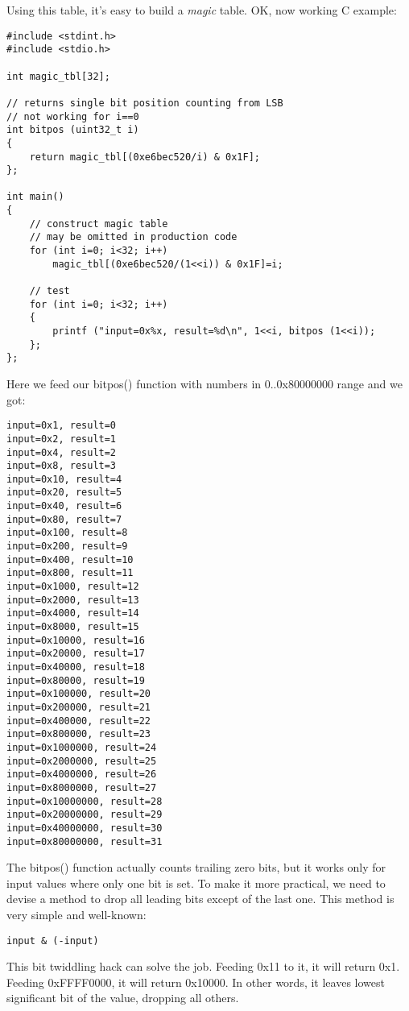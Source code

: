 Using this table, it's easy to build a \textit{magic} table.
OK, now working C example:

\begin{lstlisting}[style=customc]
#include <stdint.h>
#include <stdio.h>

int magic_tbl[32];

// returns single bit position counting from LSB
// not working for i==0
int bitpos (uint32_t i)
{
	return magic_tbl[(0xe6bec520/i) & 0x1F];
};

int main()
{
	// construct magic table
	// may be omitted in production code
	for (int i=0; i<32; i++)
		magic_tbl[(0xe6bec520/(1<<i)) & 0x1F]=i;

	// test
	for (int i=0; i<32; i++)
	{
		printf ("input=0x%x, result=%d\n", 1<<i, bitpos (1<<i));
	};
};
\end{lstlisting}

Here we feed our bitpos() function with numbers in 0..0x80000000 range and we got:

\begin{lstlisting}
input=0x1, result=0
input=0x2, result=1
input=0x4, result=2
input=0x8, result=3
input=0x10, result=4
input=0x20, result=5
input=0x40, result=6
input=0x80, result=7
input=0x100, result=8
input=0x200, result=9
input=0x400, result=10
input=0x800, result=11
input=0x1000, result=12
input=0x2000, result=13
input=0x4000, result=14
input=0x8000, result=15
input=0x10000, result=16
input=0x20000, result=17
input=0x40000, result=18
input=0x80000, result=19
input=0x100000, result=20
input=0x200000, result=21
input=0x400000, result=22
input=0x800000, result=23
input=0x1000000, result=24
input=0x2000000, result=25
input=0x4000000, result=26
input=0x8000000, result=27
input=0x10000000, result=28
input=0x20000000, result=29
input=0x40000000, result=30
input=0x80000000, result=31
\end{lstlisting}

The bitpos() function actually counts trailing zero bits, but it works only for input values where only one bit is set.
To make it more practical, we need to devise a method to drop all leading bits except of the last one.
This method is very simple and well-known:

\begin{lstlisting}
input & (-input)
\end{lstlisting}

This bit twiddling hack can solve the job. Feeding 0x11 to it, it will return 0x1. Feeding 0xFFFF0000, it will return 0x10000.
In other words, it leaves lowest significant bit of the value, dropping all others.

